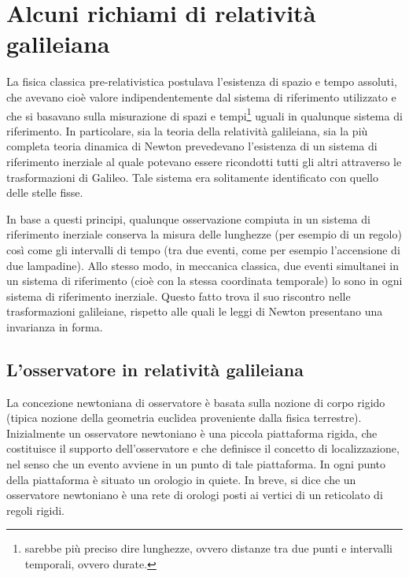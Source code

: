 \chapter{Alcuni richiami di relatività galileiana}

La fisica classica pre-relativistica postulava l'esistenza di spazio e tempo assoluti, che avevano cioè valore indipendentemente 
dal sistema di riferimento utilizzato e che si basavano sulla misurazione di spazi e tempi\footnote{sarebbe più preciso dire lunghezze,
ovvero distanze tra due punti e intervalli temporali, ovvero durate.} uguali in qualunque sistema di riferimento.
In particolare, sia la teoria della relatività galileiana, sia la più completa teoria dinamica di Newton prevedevano 
l'esistenza di un sistema di riferimento inerziale al quale potevano essere ricondotti tutti gli altri attraverso 
le trasformazioni di Galileo. Tale sistema era solitamente identificato con quello delle stelle fisse.

In base a questi principi, qualunque osservazione compiuta in un sistema di riferimento inerziale conserva la misura delle lunghezze 
(per esempio di un regolo) così come gli intervalli di tempo (tra due eventi, come per esempio l'accensione di due lampadine). 
Allo stesso modo, in meccanica classica, due eventi simultanei in un sistema di riferimento (cioè con la stessa coordinata temporale) 
lo sono in ogni sistema di riferimento inerziale. Questo fatto trova il suo riscontro nelle trasformazioni galileiane, rispetto 
alle quali le leggi di Newton presentano una invarianza in forma.

\section{L'osservatore in relatività galileiana}

La concezione newtoniana di osservatore è basata sulla nozione di corpo
rigido (tipica nozione della geometria euclidea proveniente dalla fisica terrestre). 
Inizialmente un osservatore newtoniano è una piccola piattaforma
rigida, che costituisce il supporto dell’osservatore e che definisce il concetto
di localizzazione, nel senso che un evento avviene in un punto di tale piattaforma. 
In ogni punto della piattaforma è situato un orologio in quiete. In
breve, si dice che un osservatore newtoniano è una rete di orologi posti ai
vertici di un reticolato di regoli rigidi.

